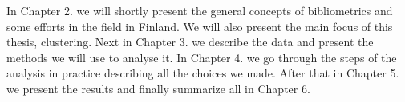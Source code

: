 

In Chapter 2. we will shortly present the general concepts of 
bibliometrics and some efforts in the field in Finland. We will 
also present the main focus of this thesis, clustering.
Next in Chapter 3. we describe the data and present the methods we 
will use to analyse it.
In Chapter 4. we go through the steps of the analysis in practice 
describing all the choices we made.
After that in Chapter 5. we present the results and finally 
summarize all in Chapter 6.











